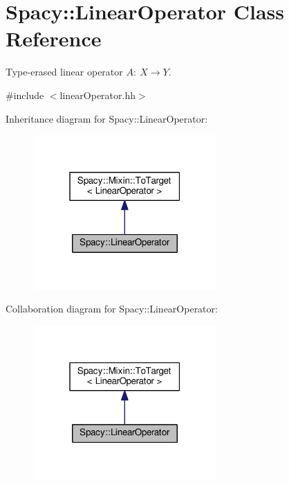 \hypertarget{classSpacy_1_1LinearOperator}{}\section{Spacy\+:\+:Linear\+Operator Class Reference}
\label{classSpacy_1_1LinearOperator}


Type-\/erased linear operator $A:\ X \to Y $.  




{\ttfamily \#include $<$linear\+Operator.\+hh$>$}



Inheritance diagram for Spacy\+:\+:Linear\+Operator\+:\nopagebreak
\begin{figure}[H]
\begin{center}
\leavevmode
\includegraphics[width=199pt]{classSpacy_1_1LinearOperator__inherit__graph}
\end{center}
\end{figure}


Collaboration diagram for Spacy\+:\+:Linear\+Operator\+:\nopagebreak
\begin{figure}[H]
\begin{center}
\leavevmode
\includegraphics[width=199pt]{classSpacy_1_1LinearOperator__coll__graph}
\end{center}
\end{figure}

